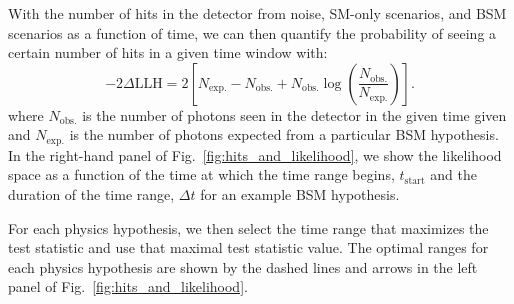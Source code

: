 With the number of hits in the detector from noise, SM-only scenarios, and BSM scenarios as a function of time, we can then quantify the probability of seeing a certain number of hits in a given time window with:
\begin{equation}
    -2\Delta\mathrm{LLH} = 2 \left[N_{\mathrm{exp.}} - N_{\mathrm{obs.}} + N_{\mathrm{obs.}}\log\left(\frac{N_{\mathrm{obs.}}}{N_{\mathrm{exp.}}}\right)\right].
\end{equation}
where $N_{\mathrm{obs.}}$ is the number of photons seen in the detector in the given time given and $N_{\mathrm{exp.}}$ is the number of photons expected from a particular BSM hypothesis.
In the right-hand panel of Fig.~\ref{fig:hits_and_likelihood}, we show the likelihood space as a function of the time at which the time range begins, $t_{\mathrm{start}}$ and the duration of the time range, $\Delta t$ for an example BSM hypothesis.

For each physics hypothesis, we then select the time range that maximizes the test statistic and use that maximal test statistic value.
The optimal ranges for each physics hypothesis are shown by the dashed lines and arrows in the left panel of Fig.~\ref{fig:hits_and_likelihood}.
